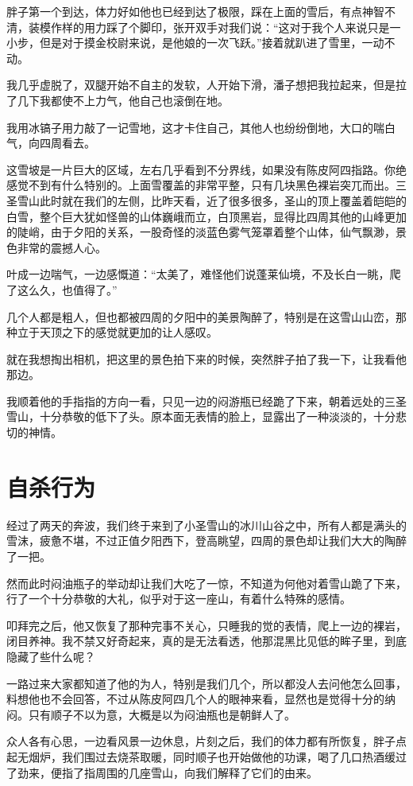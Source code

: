 胖子第一个到达，体力好如他也已经到达了极限，踩在上面的雪后，有点神智不清，装模作样的用力踩了个脚印，张开双手对我们说：“这对于我个人来说只是一小步，但是对于摸金校尉来说，是他娘的一次飞跃。”接着就趴进了雪里，一动不动。

我几乎虚脱了，双腿开始不自主的发软，人开始下滑，潘子想把我拉起来，但是拉了几下我都使不上力气，他自己也滚倒在地。

我用冰镐子用力敲了一记雪地，这才卡住自己，其他人也纷纷倒地，大口的喘白气，向四周看去。

这雪坡是一片巨大的区域，左右几乎看到不分界线，如果没有陈皮阿四指路。你绝感觉不到有什么特别的。上面雪覆盖的非常平整，只有几块黑色裸岩突兀而出。三圣雪山此时就在我们的左侧，比昨天看，近了很多很多，圣山的顶上覆盖着皑皑的白雪，整个巨大犹如怪兽的山体巍峨而立，白顶黑岩，显得比四周其他的山峰更加的陡峭，由于夕阳的关系，一股奇怪的淡蓝色雾气笼罩着整个山体，仙气飘渺，景色非常的震撼人心。

叶成一边喘气，一边感慨道：“太美了，难怪他们说蓬莱仙境，不及长白一眺，爬了这么久，也值得了。”

几个人都是粗人，但也都被四周的夕阳中的美景陶醉了，特别是在这雪山山峦，那种立于天顶之下的感觉就更加的让人感叹。

就在我想掏出相机，把这里的景色拍下来的时候，突然胖子拍了我一下，让我看他那边。

我顺着他的手指指的方向一看，只见一边的闷游瓶已经跪了下来，朝着远处的三圣雪山，十分恭敬的低下了头。原本面无表情的脸上，显露出了一种淡淡的，十分悲切的神情。

\chapter{自杀行为}

经过了两天的奔波，我们终于来到了小圣雪山的冰川山谷之中，所有人都是满头的雪沫，疲惫不堪，不过正值夕阳西下，登高眺望，四周的景色却让我们大大的陶醉了一把。

然而此时闷油瓶子的举动却让我们大吃了一惊，不知道为何他对着雪山跪了下来，行了一个十分恭敬的大礼，似乎对于这一座山，有着什么特殊的感情。

叩拜完之后，他又恢复了那种完事不关心，只睡我的觉的表情，爬上一边的裸岩，闭目养神。我不禁又好奇起来，真的是无法看透，他那混黑比见低的眸子里，到底隐藏了些什么呢？

一路过来大家都知道了他的为人，特别是我们几个，所以都没人去问他怎么回事，料想他也不会回答，不过从陈皮阿四几个人的眼神来看，显然也是觉得十分的纳闷。只有顺子不以为意，大概是以为闷油瓶也是朝鲜人了。

众人各有心思，一边看风景一边休息，片刻之后，我们的体力都有所恢复，胖子点起无烟炉，我们围过去烧茶取暖，同时顺子也开始做他的功课，喝了几口热酒缓过了劲来，便指了指周围的几座雪山，向我们解释了它们的由来。

